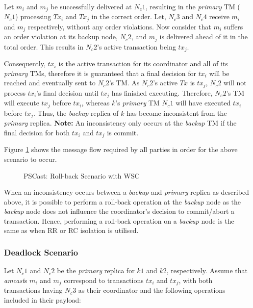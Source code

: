         Let $m_i$ and $m_j$ be successfully delivered at $N_c1$, resulting in the \emph{primary} TM ($N_c1$) processing $Tx_i$ and $Tx_j$ in the correct order.  Let, $N_c3$ and $N_c4$ receive $m_i$ and $m_j$ respectively, without any order violations. Now consider that $m_i$ suffers an order violation at its backup node, $N_c2$, and $m_j$ is delivered ahead of it in the total order.  This results in $N_c2$'s active transaction being $tx_j$.  
        
        Consequently, $tx_i$ is the active transaction for its coordinator and all of its \emph{primary} TMs, therefore it is guaranteed that a final decision for $tx_i$ will be reached and eventually sent to $N_c2$'s TM.  As $N_c2$'s active $Tx$ is $tx_j$, $N_c2$ will not process $tx_i$'s final decision until $tx_j$ has finished executing.  Therefore, $N_c2$'s TM will execute $tx_j$ before $tx_i$, whereas $k$'s \emph{primary} TM $N_c1$ will have executed $tx_i$ before $tx_j$.  Thus, the \emph{backup} replica of $k$ has become inconsistent from the \emph{primary} replica.  \textbf{Note:} An inconsistency only occurs at the \emph{backup} TM if the final decision for both $tx_i$ and $tx_j$ is commit.  
        
        Figure \ref{fig:wsc_backup_rollback} shows the message flow required by all parties in order for the above scenario to occur.  
        
    \begin{figure}[h] 
        \centering
         \caption[\textsf{PSCast}: Roll-back Scenario with WSC]{\textsf{PSCast}: Roll-back Scenario with WSC}
         \label{fig:wsc_backup_rollback}
    \end{figure}    
        
        
        When an inconsistency occurs between a \emph{backup} and \emph{primary} replica as described above, it is possible to perform a roll-back operation at the \emph{backup} node as the \emph{backup} node does not influence the coordinator's decision to commit/abort a transaction.  Hence, performing a roll-back operation on a \emph{backup} node is the same as when RR or RC isolation is utilised.  
        
        
        \subsubsection*{Deadlock Scenario}
    Let $N_c1$ and $N_c2$ be the \emph{primary} replica for $k1$ and $k2$, respectively.  Assume that \emph{amcast}s $m_i$ and $m_j$ correspond to transactions $tx_i$ and $tx_j$, with both transactions having $N_c3$ as their coordinator and the following operations included in their payload: 
    
